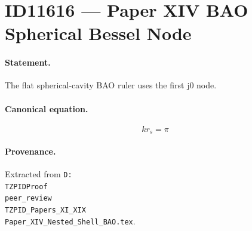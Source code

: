 \section*{ID11616 --- Paper XIV BAO Spherical Bessel Node}

\paragraph{Statement.}
The flat spherical-cavity BAO ruler uses the first j0 node.

\paragraph{Canonical equation.}
\[
k r_s=\pi
\]

\paragraph{Provenance.}
Extracted from \texttt{D:\\TZPIDProof\\peer\_review\\TZPID\_Papers\_XI\_XIX\\Paper\_XIV\_Nested\_Shell\_BAO.tex}.
